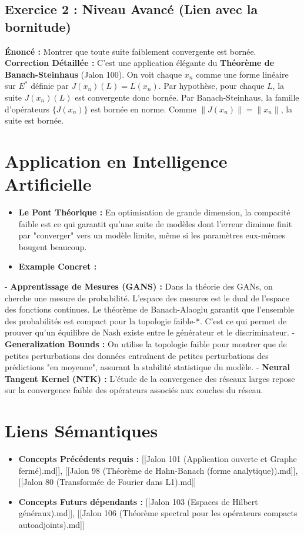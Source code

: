 \documentclass[11pt,a4paper]{article}
\begin{document}
\subsection*{Exercice 2 : Niveau Avancé (Lien avec la bornitude)}
\textbf{Énoncé :} Montrer que toute suite faiblement convergente est bornée.
\textbf{Correction Détaillée :}
C'est une application élégante du \textbf{Théorème de Banach-Steinhaus} (Jalon 100). On voit chaque $x_n$ comme une forme linéaire sur $E^*$ définie par $J(x_n)(L) = L(x_n)$. Par hypothèse, pour chaque $L$, la suite $J(x_n)(L)$ est convergente donc bornée. Par Banach-Steinhaus, la famille d'opérateurs $\{J(x_n)\}$ est bornée en norme. Comme $\|J(x_n)\| = \|x_n\|$, la suite est bornée.

\section{Application en Intelligence Artificielle}

\begin{itemize}
\item \textbf{Le Pont Théorique :} En optimisation de grande dimension, la compacité faible est ce qui garantit qu'une suite de modèles dont l'erreur diminue finit par "converger" vers un modèle limite, même si les paramètres eux-mêmes bougent beaucoup.
\item \textbf{Example Concret :}
\end{itemize}
    - \textbf{Apprentissage de Mesures (GANS) :} Dans la théorie des GANs, on cherche une mesure de probabilité. L'espace des mesures est le dual de l'espace des fonctions continues. Le théorème de Banach-Alaoglu garantit que l'ensemble des probabilités est compact pour la topologie faible-*. C'est ce qui permet de prouver qu'un équilibre de Nash existe entre le générateur et le discriminateur.
    - \textbf{Generalization Bounds :} On utilise la topologie faible pour montrer que de petites perturbations des données entraînent de petites perturbations des prédictions "en moyenne", assurant la stabilité statistique du modèle.
    - \textbf{Neural Tangent Kernel (NTK) :} L'étude de la convergence des réseaux larges repose sur la convergence faible des opérateurs associés aux couches du réseau.

\section{Liens Sémantiques}

\begin{itemize}
\item \textbf{Concepts Précédents requis :} [[Jalon 101 (Application ouverte et Graphe fermé).md]], [[Jalon 98 (Théorème de Hahn-Banach (forme analytique)).md]], [[Jalon 80 (Transformée de Fourier dans L1).md]]
\item \textbf{Concepts Futurs dépendants :} [[Jalon 103 (Espaces de Hilbert généraux).md]], [[Jalon 106 (Théorème spectral pour les opérateurs compacts autoadjoints).md]]

\end{itemize}
\end{document}
